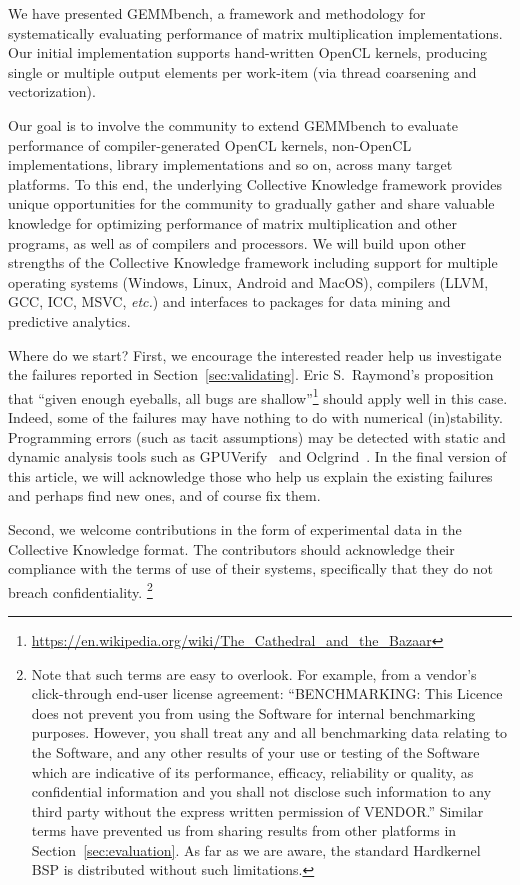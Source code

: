 \documentclass{acm_proc_article-sp} %
\begin{document}
We have presented GEMMbench, a framework and methodology for systematically
evaluating performance of matrix multiplication implementations.
%
Our initial implementation supports hand-written OpenCL kernels, producing
single or multiple output elements per work-item (via thread coarsening and
vectorization).
%

Our goal is to involve the community to extend GEMMbench to evaluate
performance of compiler-generated OpenCL kernels, non-OpenCL implementations,
library implementations and so on, across many target platforms.
%
To this end, the underlying Collective Knowledge framework provides unique
opportunities for the community to gradually gather and share valuable
knowledge for optimizing performance of matrix multiplication and other
programs, as well as of compilers and processors.
%
We will build upon other strengths of the Collective Knowledge framework including
support for multiple operating systems (Windows, Linux, Android and MacOS),
compilers (LLVM, GCC, ICC, MSVC, {\em etc.}) and interfaces to packages for
data mining and predictive analytics.

Where do we start?
%
First, we encourage the interested reader help us investigate the failures
reported in Section~\ref{sec:validating}.
%
Eric S.\ Raymond's proposition that ``given enough eyeballs, all bugs are
shallow''\footnote{\url{https://en.wikipedia.org/wiki/The_Cathedral_and_the_Bazaar}}
should apply well in this case.
%
Indeed, some of the failures may have nothing to do with numerical
(in)stability.
%
Programming errors (such as tacit assumptions) may be detected with static and
dynamic analysis tools such as GPUVerify~\cite{GPUVerify} and
Oclgrind~\cite{Oclgrind}.
%
In the final version of this article, we will acknowledge those who help us
explain the existing failures and perhaps find new ones, and of course fix them.

Second, we welcome contributions in the form of experimental data in the
Collective Knowledge format.
%
The contributors should acknowledge their compliance with the terms of use of
their systems, specifically that they do not breach confidentiality.%
\footnote{Note that such terms are easy to overlook. For example, from a
vendor's click-through end-user license agreement: ``BENCHMARKING: This Licence
does not prevent you from using the Software for internal benchmarking
purposes. However, you shall treat any and all benchmarking data relating to
the Software, and any other results of your use or testing of the Software
which are indicative of its performance, efficacy, reliability or quality, as
confidential information and you shall not disclose such information to any
third party without the express written permission of VENDOR.'' Similar terms
have prevented us from sharing results from other platforms in
Section~\ref{sec:evaluation}. As far as we are aware, the standard Hardkernel
BSP is distributed without such limitations.}
%
\end{document}
